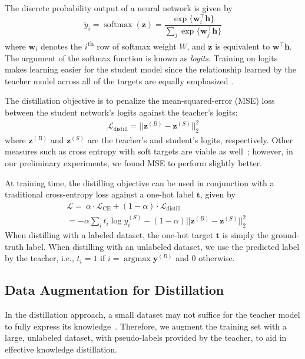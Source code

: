 \documentclass[11pt,a4paper]{article}
\DeclareMathOperator*{\softmax}{softmax}
\begin{document}
The discrete probability output of a neural network is given by
\begin{equation}
    \widetilde y_i = \softmax(\bm z) = 
    \frac{\exp\{\bm w_i^\top \bm h\}}{\sum_j\exp\{\bm w_j^\top \bm h \}}
\end{equation}
where $\bm w_i$ denotes the $i$\textsuperscript{th} row of softmax weight $W$, and $\bm z$ is equivalent to $\bm w^\top \bm h$.
The argument of the softmax function is known as \textit{logits}. Training on logits makes learning easier for the student model since the relationship learned by the teacher model across all of the targets are equally emphasized \cite{ba2014deep}.





The distillation objective is to penalize the mean-squared-error (MSE) loss between the student network's logits against the teacher's logits:
\begin{align}\label{eqn:distill}
    \mathcal{L}_\text{distill} = ||\pmb z^{(B)} - \pmb z^{(S)}||^2_2
\end{align}
where $\pmb z^{(B)}$ and $\pmb z^{(S)}$ are the teacher's and student's logits, respectively. Other measures such as cross entropy with soft targets are viable as well~\cite{hinton2015distilling}; however, in our preliminary experiments, we found MSE to perform slightly better. 

At training time, the distilling objective can be used in conjunction with a traditional cross-entropy loss against a one-hot label $\bm t$, given by
\begin{align}
&\mathcal{L} =\ \alpha\cdot \mathcal{L}_\text{CE} + (1-\alpha)\cdot\mathcal{L}_\text{distill}\\ \nonumber
&=-\alpha\sum_i t_i\log y_i^{(S)} - (1-\alpha)||\pmb z^{(B)} - \pmb z^{(S)}||^2_2
\end{align}
When distilling with a labeled dataset, the one-hot target $\bm t$ is simply the ground-truth label. When distilling with an unlabeled dataset,  we use the predicted label by the teacher, i.e., $t_i=1$ if $i=\operatorname{argmax}{ \bm y^{(B)}}$ and $0$ otherwise.



\subsection{Data Augmentation for Distillation}
In the distillation approach, a small dataset may not suffice for the teacher model to fully express its knowledge~\cite{ba2014deep}. Therefore, we augment the training set with a large, unlabeled dataset, with pseudo-labels provided by the teacher, to aid in effective knowledge distillation.
\end{document}
